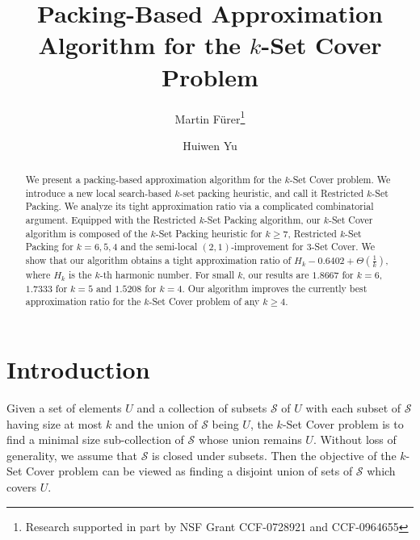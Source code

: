 \documentclass[runningheads,a4paper]{llncs}
\numberwithin{equation}{section}
\begin{document}
\mainmatter
\title{Packing-Based Approximation Algorithm for the $k$-Set Cover Problem}


\author{
Martin F\"{u}rer\thanks{Research supported in part by NSF Grant CCF-0728921 and CCF-0964655} \and Huiwen Yu
}






\date{}
\maketitle



\begin{abstract}
We present a packing-based approximation algorithm for the $k$-Set Cover problem. We introduce a new local search-based $k$-set packing heuristic, and call it Restricted $k$-Set Packing. We analyze its tight approximation ratio via a complicated combinatorial argument. Equipped with the Restricted $k$-Set Packing algorithm, our $k$-Set Cover algorithm is composed of the $k$-Set Packing heuristic \cite{schrijver} for $k\geq 7$, Restricted $k$-Set Packing for $k=6,5,4$ and the semi-local $(2,1)$-improvement \cite{furer} for 3-Set Cover. We show that our algorithm obtains a tight approximation ratio of $H_k-0.6402+\Theta(\frac{1}{k})$, where $H_k$ is the $k$-th harmonic number. For small $k$, our results are $1.8667$ for $k=6$, $1.7333$ for $k=5$ and $1.5208$ for $k=4$. Our algorithm improves the currently best approximation ratio for the $k$-Set Cover problem of any $k\geq 4$.

\end{abstract}



\section{Introduction}

Given a set of elements $U$ and a collection of subsets $\mathscr{S}$ of $U$ with each subset of $\mathscr{S}$ having size at most $k$ and the union of $\mathscr{S}$ being $U$, the $k$-Set Cover problem is to find a minimal size sub-collection of $\mathscr{S}$ whose union remains $U$. Without loss of generality, we assume that $\mathscr{S}$ is closed under subsets. Then the objective of the $k$-Set Cover problem can be viewed as finding a disjoint union of sets of $\mathscr{S}$ which covers $U$.
\end{document}
